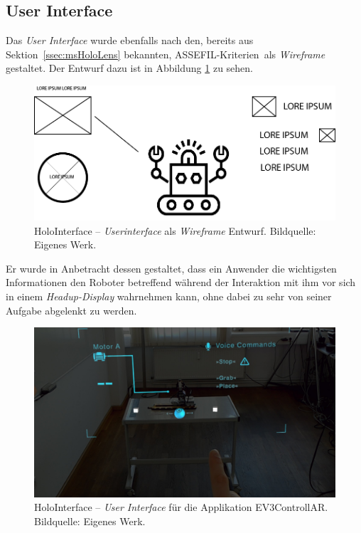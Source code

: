 \subsection{User Interface}\label{ssec:userInterface}
Das \textit{User Interface} wurde ebenfalls nach den, bereits aus Sektion~\ref{ssec:msHoloLens} bekannten, \frqq ASSEFIL-Kriterien\flqq\ als \textit{Wireframe} gestaltet. Der Entwurf dazu ist in Abbildung \ref{fig:holo_interface_wireframe} zu sehen.
\begin{figure}[H]
	\centering
	\includegraphics[width=1.0\textwidth]{figuren/InterfaceWireframe}
	\caption{HoloInterface -- \textit{Userinterface} als \textit{Wireframe} Entwurf. Bildquelle: Eigenes Werk.}
	\label{fig:holo_interface_wireframe}
\end{figure}
Er wurde in Anbetracht dessen gestaltet, dass ein Anwender die wichtigsten Informationen den Roboter betreffend während der Interaktion mit ihm vor sich in einem \textit{Headup-Display} wahrnehmen kann, ohne dabei zu sehr von seiner Aufgabe abgelenkt zu werden.
\begin{figure}[H]
	\centering
	\includegraphics[width=1.0\textwidth]{figuren/HoloInterface}
	\caption{HoloInterface -- \textit{User Interface} für die Applikation \frqq EV3ControllAR\flqq. Bildquelle: Eigenes Werk.}
	\label{fig:holo_interface}
\end{figure}

